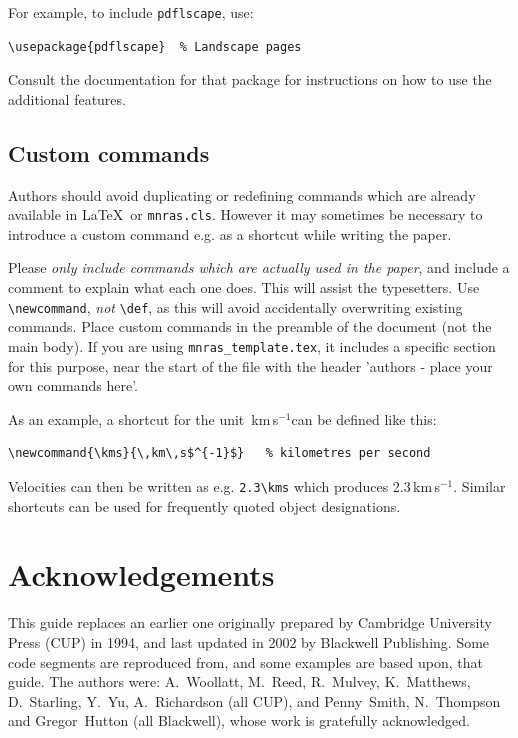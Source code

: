 \documentclass[a4paper,fleqn,usenatbib,useAMS]{mnras}
\newcommand{\kms}{\,km\,s$^{-1}$} %
\begin{document}
For example, to include \verb'pdflscape', use:
\begin{verbatim}
\usepackage{pdflscape}	% Landscape pages
\end{verbatim}
Consult the documentation for that package for instructions on how to use the additional features.


\subsection{Custom commands}

Authors should avoid duplicating or redefining commands which are already available in \LaTeX\ or \verb'mnras.cls'.
However it may sometimes be necessary to introduce a custom command e.g. as a shortcut while writing the paper.

Please \emph{only include commands which are actually used in the paper}, and include a comment to explain what each one does.
This will assist the typesetters.
Use \verb'\newcommand', \emph{not} \verb'\def', as this will avoid accidentally overwriting existing commands.
Place custom commands in the preamble of the document (not the main body).
If you are using \texttt{mnras\_template.tex}, it includes a specific section for this purpose, near the start of the file with the header 'authors - place your own commands here'.

As an example, a shortcut for the unit \kms can be defined like this:
\begin{verbatim}
\newcommand{\kms}{\,km\,s$^{-1}$}	% kilometres per second
\end{verbatim}
Velocities can then be written as e.g. \verb'2.3\kms' which produces 2.3\kms.
Similar shortcuts can be used for frequently quoted object designations.


\section*{Acknowledgements}

This guide replaces an earlier one originally prepared by Cambridge University Press (CUP) in 1994, and last updated in 2002 by Blackwell Publishing.
Some code segments are reproduced from, and some examples are based upon, that guide.
The authors were: A.~Woollatt, M.~Reed, R.~Mulvey, K.~Matthews, D.~Starling, Y.~Yu, A.~Richardson (all CUP), and Penny~Smith, N.~Thompson and Gregor~Hutton (all Blackwell), whose work is gratefully acknowledged.
\end{document}
